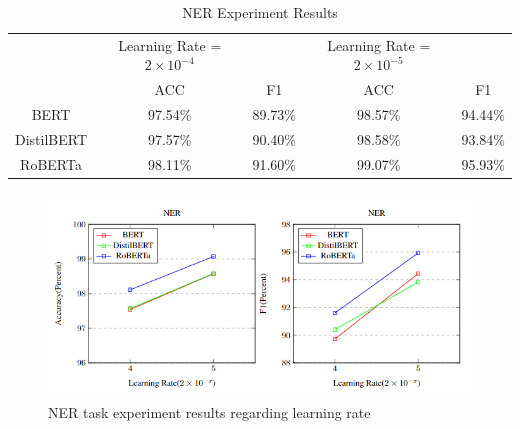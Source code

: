 \documentclass{article}
\begin{document}
\begin{table}[h]
    \centering
    \begin{tabular}{c|c|c|c|c}
        & Learning Rate = $2 \times 10^{-4}$ & & Learning Rate = $2 \times 10^{-5}$ &  \\
        & ACC & F1 & ACC & F1 \\
        \hline
        BERT & 97.54\%  & 89.73\% & 98.57\% & 94.44\% \\
        DistilBERT & 97.57\%  & 90.40\% & 98.58\% & 93.84\%\\
        RoBERTa & 98.11\% & 91.60\% & 99.07\% & 95.93\% \\
    \end{tabular}
    \caption{NER Experiment Results}
    \label{tab:my_label}
\end{table}
\begin{figure}[h]
\centering
\includegraphics[width=1\columnwidth]{lr.png}
\caption{{NER task experiment results regarding learning rate}}
\label{fig:lossimages}
\vspace{-1pt}
\end{figure}




\end{document}
